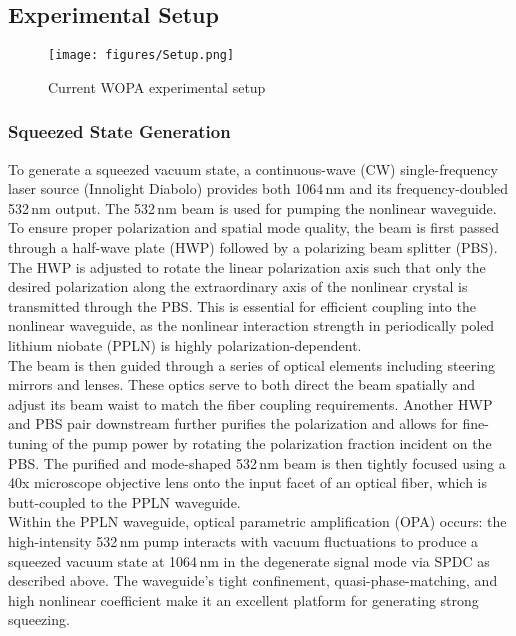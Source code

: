 \documentclass[colorlinks=true,pdfstartview=FitV,linkcolor=blue,
citecolor=red,urlcolor=magenta]{ligodoc}
\begin{document}
\subsection{Experimental Setup}

\begin{figure}[H]
    \centering
    \texttt{[image: figures/Setup.png]}
   \caption{ Current WOPA experimental setup }
    \label{fig:enter-label}
\end{figure}
\subsubsection{Squeezed State Generation}

To generate a squeezed vacuum state, a continuous-wave (CW) single-frequency laser source (Innolight Diabolo) provides both 1064\,nm and its frequency-doubled 532\,nm output. The 532\,nm beam is used for pumping the nonlinear waveguide. To ensure proper polarization and spatial mode quality, the beam is first passed through a half-wave plate (HWP) followed by a polarizing beam splitter (PBS). The HWP is adjusted to rotate the linear polarization axis such that only the desired polarization along the extraordinary axis of the nonlinear crystal is transmitted through the PBS. This is essential for efficient coupling into the nonlinear waveguide, as the nonlinear interaction strength in periodically poled lithium niobate (PPLN) is highly polarization-dependent.\\

The beam is then guided through a series of optical elements including steering mirrors and lenses. These optics serve to both direct the beam spatially and adjust its beam waist to match the fiber coupling requirements. Another HWP and PBS pair downstream further purifies the polarization and allows for fine-tuning of the pump power by rotating the polarization fraction incident on the PBS. The purified and mode-shaped 532\,nm beam is then tightly focused using a 40x microscope objective lens onto the input facet of an optical fiber, which is butt-coupled to the PPLN waveguide.\\

Within the PPLN waveguide, optical parametric amplification (OPA) occurs: the high-intensity 532\,nm pump interacts with vacuum fluctuations to produce a squeezed vacuum state at 1064\,nm in the degenerate signal mode via SPDC as described above. The waveguide’s tight confinement, quasi-phase-matching, and high nonlinear coefficient make it an excellent platform for generating strong squeezing.
\end{document}
